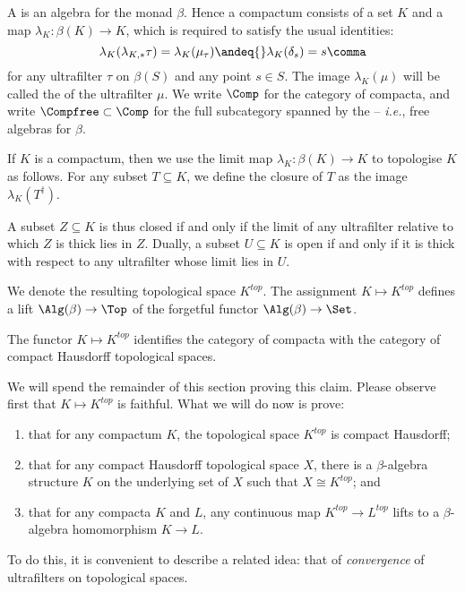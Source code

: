 \begin{definition} \label{compactaasbetaalgebras}
	A  is an algebra for the monad $ \beta $.
	Hence a compactum consists of a set $ K $ and a map $ \lambda_K \colon \beta(K) \to K $, which is required to satisfy the usual identities:
	\[
		\lambda_K(\lambda_{K,\ast}\tau) = \lambda_K(\mu_{\tau}) \andeq{} \lambda_K(\delta_s) = s \comma
	\]
	for any ultrafilter $ \tau $ on $ \beta(S) $ and any point $ s \in S $.
	The image $ \lambda_K(\mu) $ will be called the  of the ultrafilter $\mu$.
	We write $ \Comp $ for the category of compacta, and write $\Compfree \subset \Comp $ for the full subcategory spanned by the  -- \emph{i.e.}, free algebras for $ \beta $.
\end{definition}

\begin{construction} \label{turnacompactumintoatopspace}
	If $K$ is a compactum, then we use the limit map $ \lambda_K \colon \beta(K) \to K $ to topologise $ K $ as follows.
	For any subset $ T \subseteq K $, we define the closure of $ T $ as the image $ \lambda_K(T^{\dag}) $.

	A subset $ Z \subseteq K $ is thus closed if and only if the limit of any ultrafilter relative to which $ Z $ is thick lies in $ Z $.
	Dually, a subset $ U \subseteq K $ is open if and only if it is thick with respect to any ultrafilter whose limit lies in $ U $.

	We denote the resulting topological space $ K^{\textit{top}} $.
	The assignment $ K \mapsto K^{\textit{top}} $ defines a lift $ \Alg(\beta) \to \Top $ of the forgetful functor $ \Alg(\beta) \to \Set $.
\end{construction}

\begin{proposition} \label{compactaarecompacta}
	The functor $ K \mapsto K^{\textit{top}} $ identifies the category of compacta with the category of compact Hausdorff topological spaces. 
\end{proposition}

We will spend the remainder of this section proving this claim.
Please observe first that $ K \mapsto K^{\textit{top}} $ is faithful.
What we will do now is prove:
\begin{enumerate}
	\item that for any compactum $ K $, the topological space $ K^{\textit{top}} $ is compact Hausdorff;
	\item that for any compact Hausdorff topological space $ X $, there is a $ \beta $-algebra structure $ K $ on the underlying set of $ X $ such that $ X \cong K^{\textit{top}} $; and
	\item that for any compacta $ K $ and $ L $, any continuous map $ K^{\textit{top}} \to L^{\textit{top}} $ lifts to a $ \beta $-algebra homomorphism $ K \to L$.
\end{enumerate}
To do this, it is convenient to describe a related idea: that of \emph{convergence} of ultrafilters on topological spaces.

